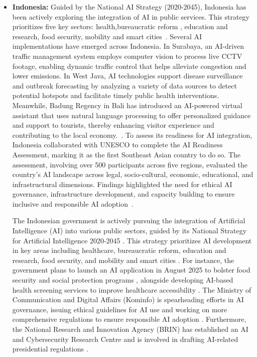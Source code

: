 \documentclass[12pt]{report}
\begin{document}
\begin{itemize}
    \item \textbf{Indonesia:} Guided by the National AI Strategy (2020-2045), Indonesia has been actively exploring the integration of AI in public services. This strategy prioritizes five key sectors: health,bureaucratic reform , education and research, food security, mobility and smart cities~\cite{stranaska,desouza2024ai}. Several AI implementations have emerged across Indonesia. In Surabaya, an AI-driven traffic management system employs computer vision to process live CCTV footage, enabling dynamic traffic control that helps alleviate congestion and lower emissions. In West Java, AI technologies support disease surveillance and outbreak forecasting by analyzing a variety of data sources to detect potential hotspots and facilitate timely public health interventions. Meanwhile, Badung Regency in Bali has introduced an AI-powered virtual assistant that uses natural language processing to offer personalized guidance and support to tourists, thereby enhancing visitor experience and contributing to the local economy.~\cite{headfoundation2024inai}.
    To assess its readiness for AI integration, Indonesia collaborated with UNESCO to complete the AI Readiness Assessment, marking it as the first Southeast Asian country to do so. The assessment, involving over 500 participants across five regions, evaluated the country's AI landscape across legal, socio-cultural, economic, educational, and infrastructural dimensions. Findings highlighted the need for ethical AI governance, infrastructure development, and capacity building to ensure inclusive and responsible AI adoption~\cite{unescoina2024ai}.

    The Indonesian government is actively pursuing the integration of Artificial Intelligence (AI) into various public sectors, guided by its National Strategy for Artificial Intelligence 2020-2045 \cite{mfat_indonesia_ai_strategy_2023, investjakarta_ai_global_trends_2025}. This strategy prioritizes AI development in key areas including healthcare, bureaucratic reform, education and research, food security, and mobility and smart cities \cite{mfat_indonesia_ai_strategy_2023}. For instance, the government plans to launch an AI application in August 2025 to bolster food security and social protection programs \cite{techinasia_indonesia_ai_2025}, alongside developing AI-based health screening services to improve healthcare accessibility \cite{govinsider_navigating_ai_2025}. The Ministry of Communication and Digital Affairs (Kominfo) is spearheading efforts in AI governance, issuing ethical guidelines for AI use and working on more comprehensive regulations to ensure responsible AI adoption \cite{opengovasia_indonesia_ai_strategy_2025, govinsider_navigating_ai_2025}. Furthermore, the National Research and Innovation Agency (BRIN) has established an AI and Cybersecurity Research Centre and is involved in drafting AI-related presidential regulations \cite{opengovasia_indonesia_ai_strategy_2025}. 
    

\end{itemize}
\end{document}
